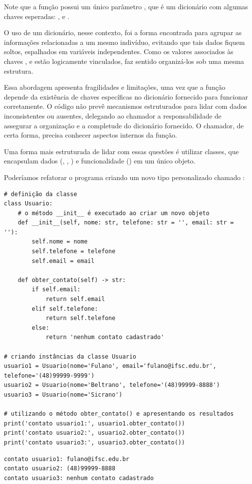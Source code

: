 Note que a função  possui um único parâmetro , que é um dicionário com
algumas chaves esperadas: ,  e .

O uso de um dicionário, nesse contexto, foi a forma encontrada para agrupar as informações relacionadas a um mesmo
indivíduo, evitando que tais dados fiquem soltos, espalhados em variáveis independentes.
Como os valores associados às chaves ,  e  estão logicamente vinculados,
faz sentido organizá-los sob uma mesma estrutura.

Essa abordagem apresenta fragilidades e limitações, uma vez que a função 
depende da existência de chaves específicas no dicionário fornecido para funcionar corretamente.
O código não prevê mecanismos estruturados para lidar com dados inconsistentes ou ausentes, delegando ao chamador a
responsabilidade de assegurar a organização e a completude do dicionário fornecido.
O chamador, de certa forma, precisa conhecer aspectos internos da função.

Uma forma mais estruturada de lidar com essas questões é utilizar classes, que encapsulam dados
(, , ) e funcionalidade () em um único objeto.


Poderíamos refatorar o programa criando um novo tipo personalizado chamado :
\begin{verbatim}
# definição da classe
class Usuario:
    # o método __init__ é executado ao criar um novo objeto
    def __init__(self, nome: str, telefone: str = '', email: str = ''):
        self.nome = nome
        self.telefone = telefone
        self.email = email

    def obter_contato(self) -> str:
        if self.email:
            return self.email
        elif self.telefone:
            return self.telefone
        else:
            return 'nenhum contato cadastrado'

# criando instâncias da classe Usuario
usuario1 = Usuario(nome='Fulano', email='fulano@ifsc.edu.br', telefone='(48)99999-9999')
usuario2 = Usuario(nome='Beltrano', telefone='(48)99999-8888')
usuario3 = Usuario(nome='Sicrano')

# utilizando o método obter_contato() e apresentando os resultados
print('contato usuario1:', usuario1.obter_contato())
print('contato usuario2:', usuario2.obter_contato())
print('contato usuario3:', usuario3.obter_contato())
\end{verbatim}
\begin{verbatim}
contato usuario1: fulano@ifsc.edu.br
contato usuario2: (48)99999-8888
contato usuario3: nenhum contato cadastrado
\end{verbatim}

